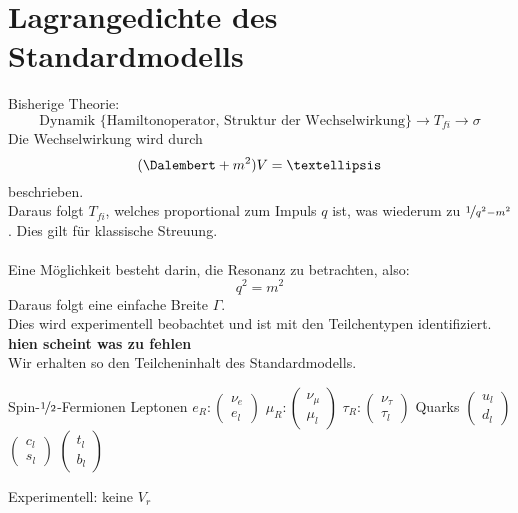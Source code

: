\chapter{Lagrangedichte des Standardmodells}

Bisherige Theorie:
\[ \text{Dynamik \{Hamiltonoperator, Struktur der Wechselwirkung\}} \rightarrow 
T_{fi} \rightarrow \sigma \]
Die Wechselwirkung wird durch 
\[ (\Dalembert + m^2) V = …  \] beschrieben. \\
Daraus folgt $T_{fi}$, welches proportional zum Impuls $q$ ist, was wiederum zu 
$\nicefrac{1}{q^2 - m^2}$. Dies gilt für klassische Streuung. \\
\\
Eine Möglichkeit besteht darin, die Resonanz zu betrachten, also:
\[ q^2 = m^2 \]
Daraus folgt eine einfache Breite $\Gamma$. \\
Dies wird experimentell beobachtet und ist mit den Teilchentypen identifiziert. 
\\
\textbf{hien scheint was zu fehlen} \\
Wir erhalten so den Teilcheninhalt des Standardmodells. \\
\begin{outline}
	\1 Spin-$\nicefrac{1}{2}$-Fermionen 
	\1 Leptonen
		\2 $e_R: \left(\begin{array}{c} \nu_e \\ e_l \end{array}\right) $
		\2 $\mu_R: \left(\begin{array}{c} \nu_{\mu} \\ \mu_l \end{array}\right) 
		$
		\2 $ \tau_R: \left(\begin{array}{c} \nu_{\tau} \\ \tau_l 
		\end{array}\right) $
	\1 Quarks
		\2 $ \left(\begin{array}{c} u_l \\ d_l \end{array}\right) $
		\2 $ \left(\begin{array}{c} c_l \\ s_l \end{array}\right) $
		\2 $ \left(\begin{array}{c} t_l \\ b_l \end{array}\right) $
\end{outline}
Experimentell: keine $V_r$ \\
\newline
